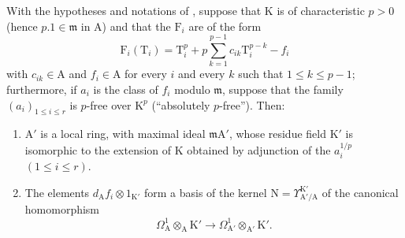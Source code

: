 \begin{proposition}[22.4.4]
\label{0.22.4.4}
With the hypotheses and notations of , suppose that $\mathrm{K}$ is of characteristic $p>0$ (hence $p.1\in\mathfrak{m}$ in $\mathrm{A}$) and that the $\mathrm{F}_i$ are of the form
\[
\label{0.22.4.4.1}
  \mathrm{F}_i(\mathrm{T}_i)=\mathrm{T}_i^p+p\sum_{k=1}^{p-1}c_{ik}\mathrm{T}_i^{p-k}-f_i
  \tag{22.4.4.1}
\]
with $c_{ik}\in\mathrm{A}$ and $f_i\in\mathrm{A}$ for every $i$ and every $k$ such that $1\leq k\leq p-1$; furthermore, if $a_i$ is the class of $f_i$ modulo $\mathfrak{m}$, suppose that the family $(a_i)_{1\leq i\leq r}$ is $p$-free over $\mathrm{K}^p$ (``absolutely $p$-free'').
Then:
\begin{enumerate}
  \item[\rm{(i)}] $\mathrm{A}'$ is a local ring, with maximal ideal $\mathfrak{m}\mathrm{A}'$, whose residue field $\mathrm{K}'$ is isomorphic to the extension of $\mathrm{K}$ obtained by adjunction of the $a_i^{1/p}$ $(1\leq i\leq r)$.


  \item[\rm{(ii)}] The elements $d_\mathrm{A}f_i\otimes 1_{\mathrm{K}'}$ form a basis of the kernel $\mathrm{N}=\Upsilon^{\mathrm{K}'}_{\mathrm{A}'/\mathrm{A}}$ of the canonical homomorphism
  \[
    \Omega^1_\mathrm{A}\otimes_\mathrm{A}\mathrm{K}'
    \longrightarrow\Omega^1_{\mathrm{A}'}\otimes_{\mathrm{A}'}\mathrm{K}'.
  \]
\end{enumerate}
\end{proposition}

